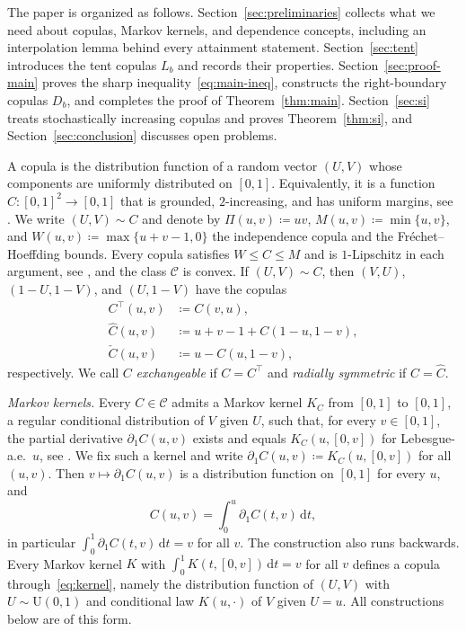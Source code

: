 \documentclass[twocolumn,a4paper]{article}
\makeatletter
\renewcommand\section{\@startsection{section}{1}{\z@}{-3.5ex \@plus -1ex \@minus -.2ex}{2.3ex \@plus.2ex}{\normalfont\Large\bfseries\raggedright}}
\numberwithin{equation}{section}
\theoremstyle{remark}
\newcommand{\CC}{\mathcal{C}}
\newcommand{\1}{\mathbf{1}}
\newcommand{\de}{\,\mathrm{d}}
\makeatother
\begin{document}
The paper is organized as follows.
Section~\ref{sec:preliminaries} collects what we need about copulas, Markov kernels, and dependence concepts, including an interpolation lemma behind every attainment statement.
Section~\ref{sec:tent} introduces the tent copulas \(L_b\) and records their properties.
Section~\ref{sec:proof-main} proves the sharp inequality~\eqref{eq:main-ineq}, constructs the right-boundary copulas \(D_b\), and completes the proof of Theorem~\ref{thm:main}.
Section~\ref{sec:si} treats stochastically increasing copulas and proves Theorem~\ref{thm:si}, and Section~\ref{sec:conclusion} discusses open problems.

\section{Preliminaries}\label{sec:preliminaries}

A copula is the distribution function of a random vector \((U,V)\) whose components are uniformly distributed on \([0,1]\).
Equivalently, it is a function \(C\colon[0,1]^2\to[0,1]\) that is grounded, \(2\)-increasing, and has uniform margins, see \cite[Ch.~2]{nelsen2006introduction}.
We write \((U,V)\sim C\) and denote by \(\Pi(u,v)\coloneqq uv\), \(M(u,v)\coloneqq\min\{u,v\}\), and \(W(u,v)\coloneqq\max\{u+v-1,0\}\) the independence copula and the Fr\'echet--Hoeffding bounds.
Every copula satisfies \(W\le C\le M\) and is \(1\)-Lipschitz in each argument, see \cite[Sec.~2.2]{nelsen2006introduction}, and the class \(\CC\) is convex.
If \((U,V)\sim C\), then \((V,U)\), \((1-U,1-V)\), and \((U,1-V)\) have the copulas
\begin{align*}
C^\top(u,v)&\coloneqq C(v,u),\\
\widehat C(u,v)&\coloneqq u+v-1+C(1-u,1-v),\\
\check C(u,v)&\coloneqq u-C(u,1-v),
\end{align*}
respectively.
We call \(C\) \emph{exchangeable} if \(C=C^\top\) and \emph{radially symmetric} if \(C=\widehat C\).

\emph{Markov kernels.}
Every \(C\in\CC\) admits a Markov kernel \(K_C\) from \([0,1]\) to \([0,1]\), a regular conditional distribution of \(V\) given \(U\), such that, for every \(v\in[0,1]\), the partial derivative \(\partial_1C(u,v)\) exists and equals \(K_C(u,[0,v])\) for Lebesgue-a.e.\ \(u\), see \cite{darsow1992copulas,durante2016principles}.
We fix such a kernel and write \(\partial_1C(u,v)\coloneqq K_C(u,[0,v])\) for all \((u,v)\).
Then \(v\mapsto\partial_1C(u,v)\) is a distribution function on \([0,1]\) for every \(u\), and
\begin{equation}\label{eq:kernel}
C(u,v)=\int_0^u\partial_1C(t,v)\de t,
\end{equation}
in particular \(\int_0^1\partial_1C(t,v)\de t=v\) for all \(v\).
The construction also runs backwards.
Every Markov kernel \(K\) with \(\int_0^1K(t,[0,v])\de t=v\) for all \(v\) defines a copula through~\eqref{eq:kernel}, namely the distribution function of \((U,V)\) with \(U\sim\mathrm{U}(0,1)\) and conditional law \(K(u,\cdot)\) of \(V\) given \(U=u\).
All constructions below are of this form.
\end{document}
